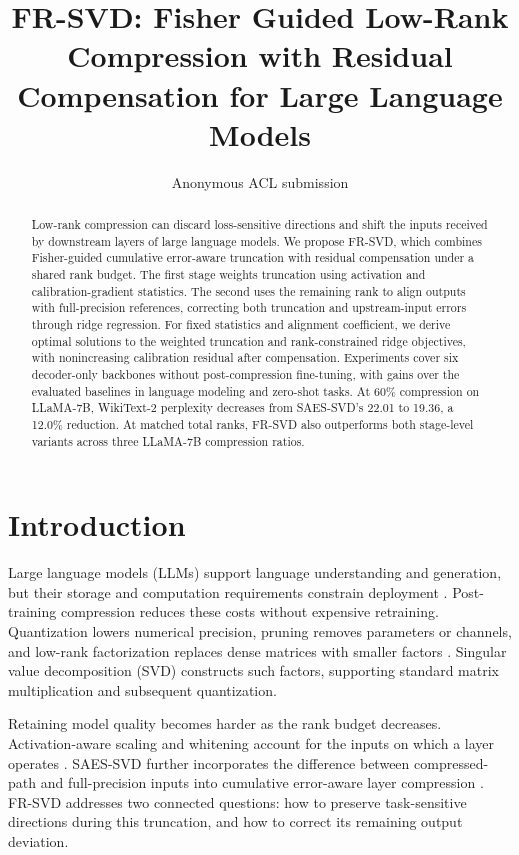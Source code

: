 \documentclass[11pt]{article}
\title{FR-SVD: Fisher Guided Low-Rank Compression with Residual Compensation for Large Language Models}
\author{Anonymous ACL submission}
\begin{document}
\raggedbottom
\maketitle

\begin{abstract}
Low-rank compression can discard loss-sensitive directions and shift the inputs received by downstream layers of large language models. We propose FR-SVD, which combines Fisher-guided cumulative error-aware truncation with residual compensation under a shared rank budget. The first stage weights truncation using activation and calibration-gradient statistics. The second uses the remaining rank to align outputs with full-precision references, correcting both truncation and upstream-input errors through ridge regression. For fixed statistics and alignment coefficient, we derive optimal solutions to the weighted truncation and rank-constrained ridge objectives, with nonincreasing calibration residual after compensation. Experiments cover six decoder-only backbones without post-compression fine-tuning, with gains over the evaluated baselines in language modeling and zero-shot tasks. At 60\% compression on LLaMA-7B, WikiText-2 perplexity decreases from SAES-SVD's 22.01 to 19.36, a 12.0\% reduction. At matched total ranks, FR-SVD also outperforms both stage-level variants across three LLaMA-7B compression ratios.
\end{abstract}

\section{Introduction}\label{sec:intro}

Large language models (LLMs) support language understanding and generation, but their storage and computation requirements constrain deployment \citep{touvron2023llama,touvron2023llama2,dubey2024llama3}. Post-training compression reduces these costs without expensive retraining. Quantization lowers numerical precision, pruning removes parameters or channels, and low-rank factorization replaces dense matrices with smaller factors \citep{frantar2023gptq,lin2023awq,frantar2023sparsegpt,ma2023llmpruner,ashkboos2024slicegpt}. Singular value decomposition (SVD) constructs such factors, supporting standard matrix multiplication and subsequent quantization.

Retaining model quality becomes harder as the rank budget decreases. Activation-aware scaling and whitening account for the inputs on which a layer operates \citep{yuan2023asvd,wang2025svdllm,wang2025svdllmv2}. SAES-SVD further incorporates the difference between compressed-path and full-precision inputs into cumulative error-aware layer compression \citep{hu2026saessvd}. FR-SVD addresses two connected questions: how to preserve task-sensitive directions during this truncation, and how to correct its remaining output deviation.
\end{document}
